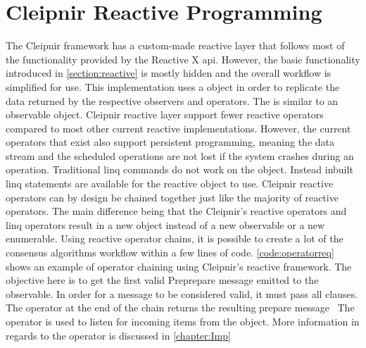 \section{Cleipnir Reactive Programming}
The Cleipnir framework has a custom-made reactive layer that follows most of the functionality provided by the Reactive X \ac{api}. However, the basic functionality introduced in \autoref{section:reactive} is mostly hidden and the overall workflow is simplified for use. This implementation uses a  object in order to replicate the data returned by the respective observers and operators. The  is similar to an observable object.
Cleipnir reactive layer support fewer reactive operators compared to most other current reactive implementations. However, the current operators that exist also support persistent programming, meaning the data stream and the scheduled operations are not lost if the system crashes during an operation. Traditional \ac{linq} commands do not work on the  object. Instead inbuilt \ac{linq} statements are available for the reactive  object to use. Cleipnir reactive operators can by design be chained together just like the majority of reactive operators. The main difference being that the Cleipnir’s reactive operators and \ac{linq} operators result in a new  object instead of a new observable or a new enumerable. Using reactive operator chains, it is possible to create a lot of the consensus algorithms workflow within a few lines of code. \autoref{code:operatorreq} shows an example of operator chaining using Cleipnir’s reactive framework. The objective here is to get the first valid Preprepare message emitted to the observable. In order for a message to be considered valid, it must pass all  clauses. The  operator at the end of the chain returns the resulting prepare message~\cites[p.~6,8,13]{PAPER:PaxosCleipnir, WEB:ReactiveOperator} The  operator is used to listen for incoming items from the   object. More information in regards to the  operator is discussed in \autoref{chapter:Imp}
\fi

